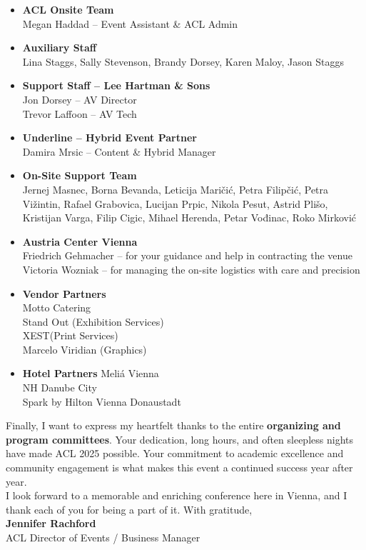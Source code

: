 \begin{itemize}

\item \textbf{ACL Onsite Team}\\
 Megan Haddad – Event Assistant \& ACL Admin


\item \textbf{Auxiliary Staff}\\
 Lina Staggs, Sally Stevenson, Brandy Dorsey, Karen Maloy, Jason Staggs


\item \textbf{Support Staff – Lee Hartman \& Sons}\\
 Jon Dorsey – AV Director\\
 Trevor Laffoon – AV Tech


\item \textbf{Underline – Hybrid Event Partner}\\
 Damira Mrsic – Content \& Hybrid Manager


\item \textbf{On-Site Support Team}\\
 Jernej Masnec, Borna Bevanda, Leticija Maričić, Petra Filipčić, Petra Vižintin, Rafael Grabovica, Lucijan Prpic, Nikola Pesut, Astrid Plišo, Kristijan Varga, Filip Cigic, Mihael Herenda, Petar Vođinac, Roko Mirković


\item \textbf{Austria Center Vienna}\\
 Friedrich Gehmacher – for your guidance and help in contracting the venue\\
 Victoria Wozniak – for managing the on-site logistics with care and precision


\item \textbf{Vendor Partners}\\
 Motto Catering\\
 Stand Out (Exhibition Services)\\
 XEST(Print Services)\\
 Marcelo Viridian (Graphics)

\item \textbf{Hotel Partners}
 Meliá Vienna\\
 NH Danube City\\
 Spark by Hilton Vienna Donaustadt

\end{itemize}

Finally, I want to express my heartfelt thanks to the entire \textbf{organizing and program committees}. Your dedication, long hours, and often sleepless nights have made ACL 2025 possible. Your commitment to academic excellence and community engagement is what makes this event a continued success year after year.\\

I look forward to a memorable and enriching conference here in Vienna, and I thank each of you for being a part of it.
With gratitude,\\


\textbf{Jennifer Rachford}\\
ACL Director of Events / Business Manager

